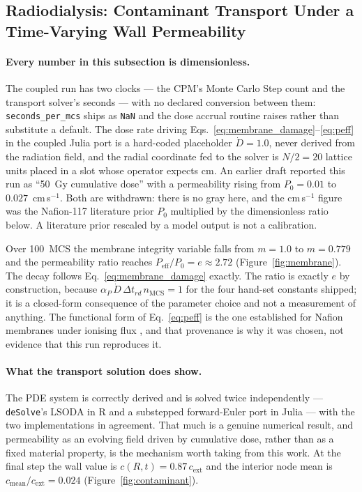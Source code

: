 \documentclass[11pt]{article}
\begin{document}
\subsection{Radiodialysis: Contaminant Transport Under a Time-Varying Wall Permeability}

\paragraph{Every number in this subsection is dimensionless.}
The coupled run has two clocks --- the CPM's Monte Carlo Step count and the transport solver's
seconds --- with no declared conversion between them: \texttt{seconds\_per\_mcs} ships as
\texttt{NaN} and the dose accrual routine raises rather than substitute a default. The dose rate
driving Eqs.~\ref{eq:membrane_damage}--\ref{eq:peff} in the coupled Julia port is a hard-coded
placeholder $\dot{D} = 1.0$, never derived from the radiation field, and the radial coordinate fed
to the solver is $N/2 = 20$ lattice units placed in a slot whose operator expects cm. An earlier
draft reported this run as ``50~Gy cumulative dose'' with a permeability rising from $P_0 = 0.01$ to
$0.027$~cm\,s$^{-1}$. Both are withdrawn: there is no gray here, and the cm\,s$^{-1}$ figure was
the Nafion-117 literature prior $P_0$ multiplied by the dimensionless ratio below. A literature
prior rescaled by a model output is not a calibration.

Over 100~MCS the membrane integrity variable falls from $m = 1.0$ to $m = 0.779$ and the
permeability ratio reaches $P_{\mathrm{eff}}/P_0 = e \approx 2.72$ (Figure~\ref{fig:membrane}).
The decay follows Eq.~\ref{eq:membrane_damage} exactly. The ratio is exactly $e$ by construction,
because $\alpha_P\,\dot{D}\,\Delta t_{rd}\,n_{\mathrm{MCS}} = 1$ for the four hand-set constants
shipped; it is a closed-form consequence of the parameter choice and not a measurement of anything.
The functional form of Eq.~\ref{eq:peff} is the one established for Nafion membranes under ionising
flux \cite{lara2023}, and that provenance is why it was chosen, not evidence that this run
reproduces it.

\paragraph{What the transport solution does show.}
The PDE system is correctly derived and is solved twice independently --- \texttt{deSolve}'s LSODA
in R and a substepped forward-Euler port in Julia --- with the two implementations in agreement.
That much is a genuine numerical result, and permeability as an evolving field driven by cumulative
dose, rather than as a fixed material property, is the mechanism worth taking from this work.
At the final step the wall value is $c(R,t) = 0.87\,c_{\mathrm{ext}}$ and the interior node mean is
$c_{\mathrm{mean}}/c_{\mathrm{ext}} = 0.024$ (Figure~\ref{fig:contaminant}).
\end{document}
